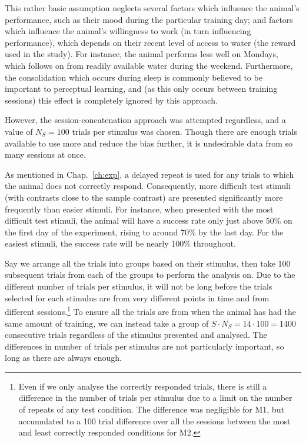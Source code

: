 This rather basic assumption neglects several factors which influence the animal's performance, such as their mood during the particular training day; and factors which influence the animal's willingness to work (in turn influencing performance), which depends on their recent level of access to water (the reward used in the study). For instance, the animal performs less well on Mondays, which follows on from readily available water during the weekend.
Furthermore, the consolidation which occurs during sleep is commonly believed to be important to perceptual learning, and (as this only occurs between training sessions) this effect is completely ignored by this approach.

However, the session-concatenation approach was attempted regardless, and a value of $N_S = 100$ trials per stimulus was chosen. Though there are enough trials available to use more and reduce the bias further, it is undesirable data from so many sessions at once.

As mentioned in Chap.~\ref{ch:exp}, a delayed repeat is used for any trials to which the animal does not correctly respond. Consequently, more difficult test stimuli (with contrasts close to the sample contrast) are presented significantly more frequently than easier stimuli.
For instance, when presented with the most difficult test stimuli, the animal will have a success rate only just above 50\% on the first day of the experiment, rising to around 70\% by the last day. For the easiest stimuli, the success rate will be nearly 100\% throughout.

Say we arrange all the trials into groups based on their stimulus, then take 100 subsequent trials from each of the groups to perform the analysis on. Due to the different number of trials per stimulus, it will not be long before the trials selected for each stimulus are from very different points in time and from different sessions.\footnote{Even if we only analyse the correctly responded trials, there is still a difference in the number of trials per stimulus due to a limit on the number of repeats of any test condition. The difference was negligible for M1, but accumulated to a 100 trial difference over all the sessions between the most and least correctly responded conditions for M2.}
To ensure all the trials are from when the animal has had the same amount of training, we can instead take a group of $S \cdot N_S = 14 \cdot 100 = 1400$ consecutive trials regardless of the stimulus presented and analysed. The differences in number of trials per stimulus are not particularly important, so long as there are always  enough.

